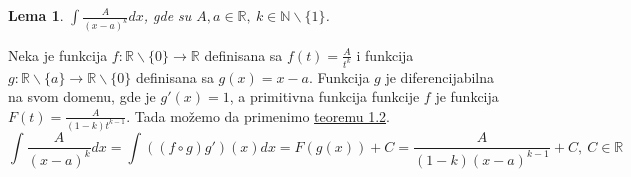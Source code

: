 \documentclass{article}
\newtheorem{lema}{Lema}[section]
\begin{document}
\begin{lemabox}
    \begin{lema}
        $\int \frac{A}{(x-a)^k}dx$, gde su $A,a\in \mathbb{R},\ k\in\mathbb{N}\backslash\{1\}$.
    \end{lema}
    Neka je funkcija $f:\mathbb{R}\backslash\{0\}\rightarrow\mathbb{R}$ definisana sa
    $f(t)=\frac{A}{t^k}$ i funkcija $g:\mathbb{R}\backslash\{a\}\rightarrow\mathbb{R}\backslash\{0\}$
    definisana sa $g(x)=x-a$. Funkcija $g$ je diferencijabilna na svom domenu, gde je $g'(x)=1$, a primitivna funkcija
    funkcije $f$ je funkcija $F(t)=\frac{A}{(1-k)t^{k-1}}$. Tada možemo da primenimo \hyperref[teorema_1.2]{teoremu 1.2}.
    \begin{equation*}
        \int \frac{A}{(x-a)^k}dx = \int ((f\circ g) g')(x)dx = F(g(x)) + C= \frac{A}{(1-k)(x-a)^{k-1}}+ C,\ C\in\mathbb{R}
    \end{equation*}
\end{lemabox}
\end{document}
